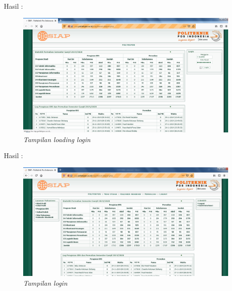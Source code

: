 \begin{enumerate}
\newpage

Hasil :
\begin{figure}[H]
    	\centering
    	\includegraphics[scale=0.3]{Figures/figures/hasillogin.png}
    	\caption{\textit{Tampilan loading login}}
    	\label{CLI}
	\end{figure}
	
Hasil :
\begin{figure}[H]
    	\centering
    	\includegraphics[scale=0.3]{Figures/figures/hasillogin1.png}
    	\caption{\textit{Tampilan login}}
    	\label{CLI}
	\end{figure}



\end{enumerate}
